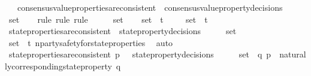 \begin{isabellebody}
\ \ {\isasymlongrightarrow}\ consensus{\isacharunderscore}value{\isacharunderscore}properties{\isacharunderscore}are{\isacharunderscore}consistent\ {\isacharparenleft}{\isasymUnion}\ {\isacharbraceleft}consensus{\isacharunderscore}value{\isacharunderscore}property{\isacharunderscore}decisions\ {\isasymsigma}\ {\isacharbar}\ {\isasymsigma}{\isachardot}\ {\isasymsigma}\ {\isasymin}\ {\isasymsigma}{\isacharunderscore}set{\isacharbraceright}{\isacharparenright}{\isachardoublequoteclose}\isanewline
%
\isadelimproof
\ \ %
\endisadelimproof
%
\isatagproof
{}\isamarkupfalse%
\ {\isacharparenleft}rule{\isacharcomma}\ rule{\isacharcomma}\ rule{\isacharparenright}\isanewline
{}\isamarkupfalse%
\ {\isacharminus}\isanewline
\ \ \isamarkupfalse%
\ {\isasymsigma}{\isacharunderscore}set\isanewline
\ \ \isamarkupfalse%
\ {\isachardoublequoteopen}{\isasymsigma}{\isacharunderscore}set\ {\isasymsubseteq}\ {\isasymSigma}t{\isachardoublequoteclose}\isanewline
\isanewline
\ \ \isamarkupfalse%
\ {\isachardoublequoteopen}{\isasymUnion}\ {\isasymsigma}{\isacharunderscore}set\ {\isasymin}\ {\isasymSigma}t{\isachardoublequoteclose}\isanewline
\ \ \isamarkupfalse%
\ {\isachardoublequoteopen}state{\isacharunderscore}properties{\isacharunderscore}are{\isacharunderscore}consistent\ {\isacharparenleft}{\isasymUnion}\ {\isacharbraceleft}state{\isacharunderscore}property{\isacharunderscore}decisions\ {\isasymsigma}\ {\isacharbar}\ {\isasymsigma}{\isachardot}\ {\isasymsigma}\ {\isasymin}\ {\isasymsigma}{\isacharunderscore}set{\isacharbraceright}{\isacharparenright}{\isachardoublequoteclose}\isanewline
\ \ \ \ \isamarkupfalse%
\ {\isacartoucheopen}{\isasymsigma}{\isacharunderscore}set\ {\isasymsubseteq}\ {\isasymSigma}t{\isacartoucheclose}\ n{\isacharunderscore}party{\isacharunderscore}safety{\isacharunderscore}for{\isacharunderscore}state{\isacharunderscore}properties\ \isamarkupfalse%
\ auto\isanewline
\ \ \isamarkupfalse%
\ {\isachardoublequoteopen}state{\isacharunderscore}properties{\isacharunderscore}are{\isacharunderscore}consistent\ {\isacharbraceleft}p\ {\isasymin}\ {\isasymUnion}\ {\isacharbraceleft}state{\isacharunderscore}property{\isacharunderscore}decisions\ {\isasymsigma}\ {\isacharbar}\ {\isasymsigma}{\isachardot}\ {\isasymsigma}\ {\isasymin}\ {\isasymsigma}{\isacharunderscore}set{\isacharbraceright}{\isachardot}\ {\isasymexists}\ q{\isachardot}\ p\ {\isacharequal}\ naturally{\isacharunderscore}corresponding{\isacharunderscore}state{\isacharunderscore}property\ q{\isacharbraceright}{\isachardoublequoteclose}\isanewline

\end{isabellebody}
